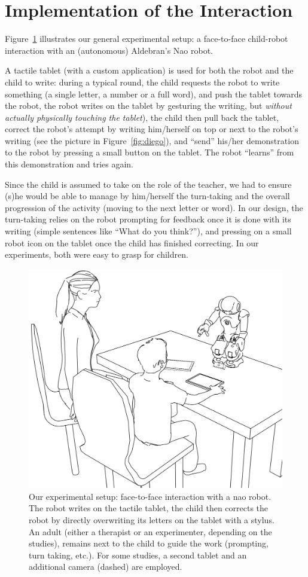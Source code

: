 \documentclass{article}
\begin{document}
\section{Implementation of the Interaction}

Figure~\ref{experimental_setup} illustrates our general experimental setup: a
face-to-face child-robot interaction with an (autonomous) Aldebran's Nao robot.

A tactile tablet (with a custom application) is used for both the robot and the
child to write: during a typical round, the child requests the robot to write
something (a single letter, a number or a full word), and push the tablet
towards the robot, the robot writes on the tablet by gesturing the writing, but
\emph{without actually physically touching the tablet}), the child then pull
back the tablet, correct the robot's attempt by writing him/herself on top or
next to the robot's writing (see the picture in Figure~\ref{fig:diego}), and
``send'' his/her demonstration to the robot by pressing a small button on the
tablet. The robot ``learns'' from this demonstration and tries again.

Since the child is assumed to take on the role of the teacher, we had to ensure
(s)he would be able to manage by him/herself the turn-taking and the overall
progression of the activity (moving to the next letter or word). In our design,
the turn-taking relies on the robot prompting for feedback once it is done with
its writing (simple sentences like ``What do you think?''), and pressing on a
small robot icon on the tablet once the child has finished correcting. In our
experiments, both were easy to grasp for children.


\begin{figure}
    \centering
    \includegraphics[width=0.6\columnwidth]{experimental_setup}
    \caption{\small Our experimental setup: face-to-face interaction with a {\sc
        nao} robot.  The robot writes on the tactile tablet, the child then
        corrects the robot by directly overwriting its letters on the tablet
        with a stylus. An adult (either a therapist or an experimenter,
        depending on the studies), remains next to the child to guide the work
        (prompting, turn taking, etc.). For some studies, a second tablet and an
        additional camera (dashed) are employed.}

    \label{experimental_setup}
\end{figure}
\end{document}
